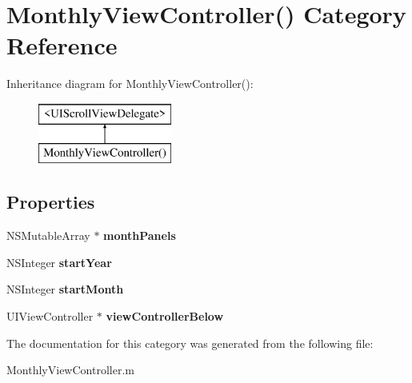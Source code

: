 \hypertarget{category_monthly_view_controller_07_08}{\section{Monthly\+View\+Controller() Category Reference}
\label{category_monthly_view_controller_07_08}
}
Inheritance diagram for Monthly\+View\+Controller()\+:\begin{figure}[H]
\begin{center}
\leavevmode
\includegraphics[height=2.000000cm]{category_monthly_view_controller_07_08}
\end{center}
\end{figure}
\subsection*{Properties}
\begin{DoxyCompactItemize}
\item 
\hypertarget{category_monthly_view_controller_07_08_a03a7be68ce15d9dc920c841a266606d3}{N\+S\+Mutable\+Array $\ast$ {\bfseries month\+Panels}}\label{category_monthly_view_controller_07_08_a03a7be68ce15d9dc920c841a266606d3}

\item 
\hypertarget{category_monthly_view_controller_07_08_abd36b5c72f155b22fd082cba3c75e2bd}{N\+S\+Integer {\bfseries start\+Year}}\label{category_monthly_view_controller_07_08_abd36b5c72f155b22fd082cba3c75e2bd}

\item 
\hypertarget{category_monthly_view_controller_07_08_a0190a119f27192e34cda256d2c560303}{N\+S\+Integer {\bfseries start\+Month}}\label{category_monthly_view_controller_07_08_a0190a119f27192e34cda256d2c560303}

\item 
\hypertarget{category_monthly_view_controller_07_08_a2dd242ed5b0194094c6cb1f4e48f545f}{U\+I\+View\+Controller $\ast$ {\bfseries view\+Controller\+Below}}\label{category_monthly_view_controller_07_08_a2dd242ed5b0194094c6cb1f4e48f545f}

\end{DoxyCompactItemize}


The documentation for this category was generated from the following file\+:\begin{DoxyCompactItemize}
\item 
Monthly\+View\+Controller.\+m\end{DoxyCompactItemize}
